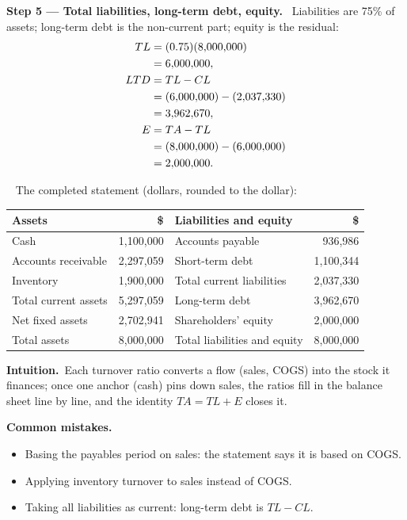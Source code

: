 \documentclass[11pt,a4paper]{article}
\newcommand{\step}[2]{\par\medskip\noindent\textbf{Step #1 --- #2.}~}
\newcommand{\intuition}{\par\medskip\noindent\textbf{Intuition.}~}
\newcommand{\answer}[1]{\par\smallskip\noindent\fbox{\textbf{Answer #1.}}~}
\newcommand{\pitfalls}{\par\medskip\noindent\textbf{Common mistakes.}}
\begin{document}
\step{5}{Total liabilities, long-term debt, equity}
Liabilities are 75\% of assets; long-term debt is the non-current part; equity is the residual:
\begin{align}
  TL &= (0.75)(8{,}000{,}000) \notag\\
  &= 6{,}000{,}000, \notag\\
  LTD &= TL - CL \notag\\
  &= (6{,}000{,}000) - (2{,}037{,}330) \notag\\
  &= 3{,}962{,}670, \notag\\
  E &= TA - TL \notag\\
  &= (8{,}000{,}000) - (6{,}000{,}000) \notag\\
  &= 2{,}000{,}000. \notag
\end{align}

\answer{(balance sheet)} The completed statement (dollars, rounded to the dollar):

\begin{center}
\begin{tabular}{lr@{\qquad}lr}
\toprule
Assets & \$ & Liabilities and equity & \$\\
\midrule
Cash & 1,100,000 & Accounts payable & 936,986\\
Accounts receivable & 2,297,059 & Short-term debt & 1,100,344\\
Inventory & 1,900,000 & Total current liabilities & 2,037,330\\
Total current assets & 5,297,059 & Long-term debt & 3,962,670\\
Net fixed assets & 2,702,941 & Shareholders' equity & 2,000,000\\
\midrule
Total assets & 8,000,000 & Total liabilities and equity & 8,000,000\\
\bottomrule
\end{tabular}
\end{center}

\intuition Each turnover ratio converts a flow (sales, COGS) into the stock it finances; once one
anchor (cash) pins down sales, the ratios fill in the balance sheet line by line, and the identity
$TA = TL + E$ closes it.

\pitfalls
\begin{itemize}
  \item Basing the payables period on sales: the statement says it is based on COGS.
  \item Applying inventory turnover to sales instead of COGS.
  \item Taking all liabilities as current: long-term debt is $TL - CL$.
\end{itemize}
\end{document}
